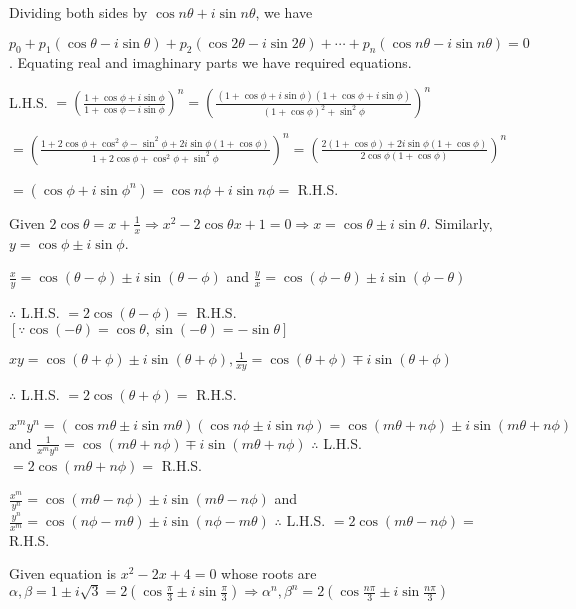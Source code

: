   Dividing both sides by $\cos n\theta + i\sin n\theta$, we have

  $p_0 + p_1(\cos\theta - i\sin\theta) + p_2(\cos2\theta - i\sin2\theta) + \cdots + p_n(\cos n\theta - i\sin
  n\theta) = 0$. Equating real and imaghinary parts we have required equations.
\item L.H.S. $= \left(\frac{1 + \cos \phi + i \sin\phi}{1 + \cos \phi - i\sin\phi}\right)^n = \left(\frac{(1
  + \cos\phi + i \sin\phi)(1 + \cos\phi + i\sin\phi)}{(1 + \cos\phi)^2 + \sin^2\phi}\right)^n$

  $= \left(\frac{1+ 2\cos\phi + \cos^2\phi - \sin^2\phi + 2i \sin\phi(1 + \cos\phi)}{1 + 2\cos\phi +
  \cos^2\phi + \sin^2\phi}\right)^n= \left(\frac{2(1 + \cos\phi) + 2i \sin\phi(1 +
  \cos\phi)}{2\cos\phi(1 + \cos\phi)}\right)^n$

  $= (\cos\phi + i \sin\phi^n) = \cos n\phi + i \sin n\phi =$ R.H.S.
\item Given $2\cos\theta = x + \frac{1}{x} \Rightarrow x^2 - 2\cos\theta x + 1 = 0 \Rightarrow x =
  \cos\theta\pm i\sin\theta$. Similarly, $y = \cos\phi\pm i\sin\phi$.
  \startitemize[i]
  \item $\frac{x}{y} = \cos(\theta - \phi) \pm i\sin(\theta - \phi)$ and $\frac{y}{x} = \cos(\phi -
    \theta)\pm i\sin(\phi - \theta)$

    $\therefore$ L.H.S. $= 2\cos(\theta - \phi) =$ R.H.S. $[\because \cos(-\theta) = \cos\theta,
      \sin(-\theta) = -\sin\theta]$
  \item $xy = \cos(\theta + \phi) \pm i\sin(\theta + \phi), \frac{1}{xy} = \cos(\theta + \phi)\mp
    i\sin(\theta + \phi)$

    $\therefore$ L.H.S. $= 2\cos(\theta + \phi) =$ R.H.S.
  \item $x^my^n = (\cos m\theta \pm i\sin m\theta)(\cos n\phi \pm i\sin n\phi) = \cos(m\theta + n\phi)\pm
    i\sin(m\theta + n\phi)$ and $\frac{1}{x^my^n} = \cos(m\theta + n\phi)\mp i\sin(m\theta + n\phi)$
    $\therefore$ L.H.S. $= 2\cos(m\theta + n\phi) =$ R.H.S.
  \item $\frac{x^m}{y^n} = \cos(m\theta - n\phi)\pm i\sin(m\theta - n\phi)$ and $\frac{y^n}{x^m} =
    \cos(n\phi - m\theta)\pm i\sin(n\phi - m\theta)$
    $\therefore$ L.H.S. $= 2\cos(m\theta - n\phi) =$ R.H.S.
  \stopitemize
\item Given equation is $x^2 - 2x + 4 = 0$ whose roots are $\alpha, \beta = 1\pm i\sqrt{3} =
  2\left(\cos\frac{\pi}{3}\pm i\sin\frac{\pi}{3}\right)\Rightarrow \alpha^n, \beta^n =
  2\left(\cos\frac{n\pi}{3}\pm i\sin\frac{n\pi}{3}\right)$

